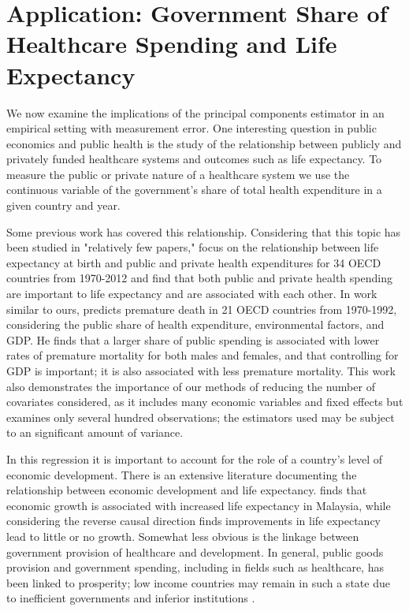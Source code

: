 \documentclass[10pt]{article}
\begin{document}
    \section*{Application: Government Share of Healthcare Spending and Life Expectancy}

        We now examine the implications of the principal components estimator in an empirical setting with measurement error. One interesting question in public economics and public health is the study of the relationship between publicly and privately funded healthcare systems and outcomes such as life expectancy. To measure the public or private nature of a healthcare system we use the continuous variable of the government's share of total health expenditure in a given country and year.

        Some previous work has covered this relationship. Considering that this topic has been studied in "relatively few papers," \cite{linden_life_2017} focus on the relationship between life expectancy at birth and public and private health expenditures for 34 OECD countries from 1970-2012 and find that both public and private health spending are important to life expectancy and are associated with each other. In work similar to ours, \cite{or_determinants_2000} predicts premature death in 21 OECD countries from 1970-1992, considering the public share of health expenditure, environmental factors, and GDP. He finds that a larger share of public spending is associated with lower rates of premature mortality for both males and females, and that controlling for GDP is important; it is also associated with less premature mortality. This work also demonstrates the importance of our methods of reducing the number of covariates considered, as it includes many economic variables and fixed effects but examines only several hundred observations; the estimators used may be subject to an significant amount of variance.

        In this regression it is important to account for the role of a country's level of economic development. There is an extensive literature documenting the relationship between economic development and life expectancy. \cite{ling_testing_2017} finds that economic growth is associated with increased life expectancy in Malaysia, while considering the reverse causal direction \cite{acemoglu_disease_2007} finds improvements in life expectancy lead to little or no growth. Somewhat less obvious is the linkage between government provision of healthcare and development. In general, public goods provision and government spending, including in fields such as healthcare, has been linked to prosperity; low income countries may remain in such a state due to inefficient governments and inferior institutions \citep{wu_impact_2010}.
\end{document}
